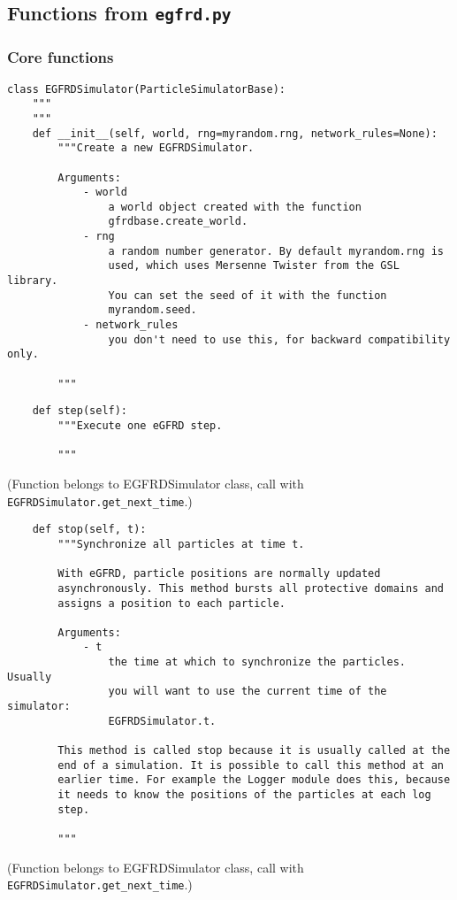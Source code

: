 \documentclass[a4paper,10pt]{article}
\begin{document}
\subsection{Functions from \texttt{egfrd.py}}

\subsubsection{Core functions}
\begin{verbatim}
class EGFRDSimulator(ParticleSimulatorBase):
    """
    """
    def __init__(self, world, rng=myrandom.rng, network_rules=None):
        """Create a new EGFRDSimulator.

        Arguments:
            - world
                a world object created with the function 
                gfrdbase.create_world.
            - rng
                a random number generator. By default myrandom.rng is 
                used, which uses Mersenne Twister from the GSL library.
                You can set the seed of it with the function 
                myrandom.seed.
            - network_rules
                you don't need to use this, for backward compatibility only.

        """
\end{verbatim}

\begin{verbatim}
    def step(self):
        """Execute one eGFRD step.

        """
\end{verbatim}
(Function belongs to EGFRDSimulator class, call with \texttt{EGFRDSimulator.get\_next\_time}.)

\begin{verbatim}
    def stop(self, t):
        """Synchronize all particles at time t.

        With eGFRD, particle positions are normally updated 
        asynchronously. This method bursts all protective domains and 
        assigns a position to each particle.

        Arguments:
            - t
                the time at which to synchronize the particles. Usually 
                you will want to use the current time of the simulator: 
                EGFRDSimulator.t.

        This method is called stop because it is usually called at the 
        end of a simulation. It is possible to call this method at an 
        earlier time. For example the Logger module does this, because 
        it needs to know the positions of the particles at each log 
        step.

        """
\end{verbatim}
(Function belongs to EGFRDSimulator class, call with \texttt{EGFRDSimulator.get\_next\_time}.)
\end{document}
